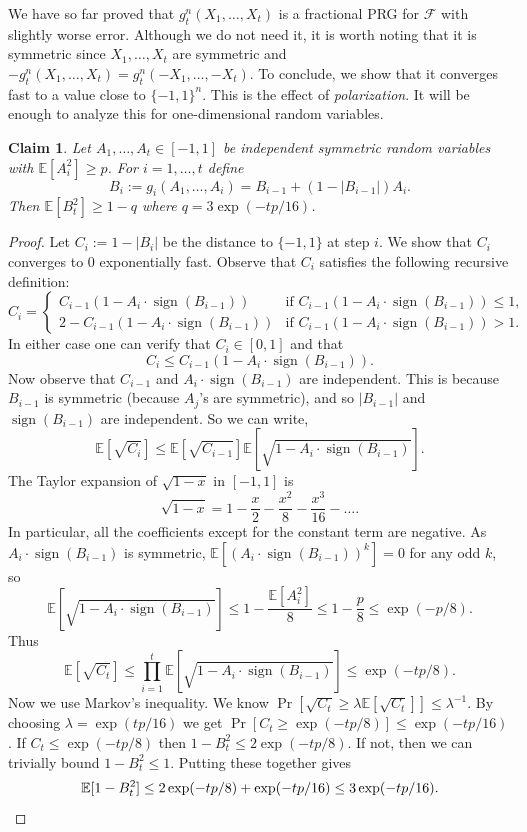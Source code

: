 \documentclass[11pt]{article}
\numberwithin{equation}{section}
\newtheorem{claim}[theorem]{Claim}
\theoremstyle{definition}
\theoremstyle{plain}
\newcommand{\E}{\mathbb{E}}
\newcommand{\FF}{\mathcal{F}}
\DeclareMathOperator{\sign}{sign}     %
\begin{document}
We have so far proved that $g_t^n(X_1,\ldots,X_t)$ is a fractional PRG for $\FF$ with slightly worse error. Although we do not need it, it is worth
noting that it is symmetric since $X_1,\ldots,X_t$ are symmetric
and $-g_t^n(X_1,\ldots,X_t)=g_t^n(-X_1,\ldots,-X_t)$.
To conclude, we show that it
converges fast to a value close to $\{-1,1\}^n$. This is the effect of \emph{polarization}. It will be enough to analyze this
for one-dimensional random variables.

\begin{claim}
\label{claim:polar_onedim}
Let $A_1,\ldots,A_t \in [-1,1]$ be independent symmetric random variables with $\E[A_i^2] \ge p$.
For $i=1,\ldots,t$ define
$$
B_i:=g_i(A_1,\ldots,A_i) = B_{i-1} + (1-|B_{i-1}|) A_i.
$$
Then $\E[B_t^2] \ge 1-q$ where $q=3 \exp(-tp/16)$.
\end{claim}

\begin{proof}
 Let $C_i := 1-|B_i|$ be the distance to $\{-1,1\}$ at step $i$. We show that $C_i$ converges to $0$ exponentially fast. Observe that $C_i$ satisfies the following recursive definition:
$$
C_i =
\begin{cases}
C_{i-1} (1-A_i\cdot \sign(B_{i-1})) & \text{if } C_{i-1} (1-A_i\cdot\sign(B_{i-1})) \le 1, \\
2 - C_{i-1} (1-A_i\cdot \sign(B_{i-1})) & \text{if } C_{i-1} (1-A_i\cdot \sign(B_{i-1})) > 1.
\end{cases}
$$
In either case one can verify that $C_i \in [0,1]$ and that
$$
	C_i \le C_{i-1} (1-A_i\cdot\sign(B_{i-1})).
$$
	Now observe that $C_{i-1}$ and $A_i\cdot\sign(B_{i-1})$ are independent. This is because $B_{i-1}$ is symmetric (because $A_j$'s are symmetric), and so $|B_{i-1}|$ and $\sign(B_{i-1})$ are independent. So we can write, 
$$
\E\left[\sqrt{C_i}\right] \leq \E\left[\sqrt{C_{i-1}}\right] \E\left[\sqrt{1-A_i\cdot\sign(B_{i-1})}\right].
$$
The Taylor expansion of $\sqrt{1-x}$ in $[-1,1]$ is
$$
\sqrt{1-x} = 1 - \frac{x}{2} - \frac{x^2}{8}  - \frac{x^3}{16} - \ldots.
$$
	In particular, all the coefficients except for the constant term are negative. As $A_i\cdot\sign(B_{i-1})$ is symmetric, $\E[(A_i\cdot\sign(B_{i-1}))^k]=0$ for any odd $k$, so
$$
\E\left[\sqrt{1-A_i\cdot\sign(B_{i-1})}\right] \le 1 - \frac{\E[A_i^2]}{8} \le 1-\frac{p}{8} \le \exp(-p/8).
$$
Thus
$$
\E\left[\sqrt{C_t}\right] \le \prod_{i=1}^t \E\left[\sqrt{1-A_i\cdot\sign(B_{i-1})}\right] \le \exp(-t p / 8).
$$
	Now we use Markov's inequality. We know $\Pr[\sqrt{C_t}\geq \lambda \E\left[\sqrt{C_t}\right] ] \leq \lambda^{-1}$. By choosing $\lambda = \exp(t p / 16)$ we get $\Pr[C_t \geq \exp(-t p / 8) ] \leq \exp(-t p / 16)$.
 If $C_t \le \exp(-tp/8)$ then $1-B_t^2 \le 2 \exp(-tp/8)$.
If not, then we can trivially bound $1-B_t^2 \le 1$. Putting these together gives
\[
\E[1-B_t^2] \le 2 \exp(-tp/8) + \exp(-tp/16) \le 3 \exp(-tp/16).\qedhere
\]
\end{proof}
\end{document}
